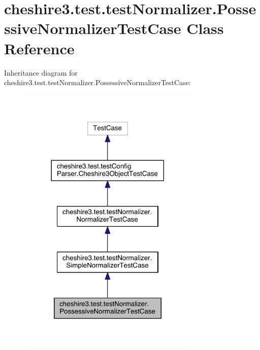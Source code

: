 \hypertarget{classcheshire3_1_1test_1_1test_normalizer_1_1_possessive_normalizer_test_case}{\section{cheshire3.\-test.\-test\-Normalizer.\-Possessive\-Normalizer\-Test\-Case Class Reference}
\label{classcheshire3_1_1test_1_1test_normalizer_1_1_possessive_normalizer_test_case}
}


Inheritance diagram for cheshire3.\-test.\-test\-Normalizer.\-Possessive\-Normalizer\-Test\-Case\-:
\nopagebreak
\begin{figure}[H]
\begin{center}
\leavevmode
\includegraphics[width=246pt]{classcheshire3_1_1test_1_1test_normalizer_1_1_possessive_normalizer_test_case__inherit__graph}
\end{center}
\end{figure}


